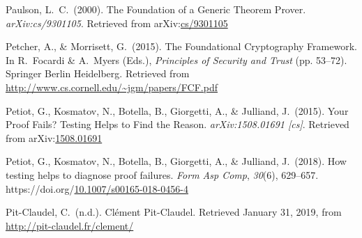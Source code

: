 \documentclass[12pt,twoside]{article}
\begin{document}
{\begin{thebibliography}{222}
\mdbibitemlabel{[Paulson, 2000]}Paulson, L.~C.~(2000). The Foundation of a Generic Theorem Prover. \emph{arXiv:cs/9301105}. Retrieved from arXiv:\href{http://arxiv.org/abs/cs/9301105}{cs/9301105}\label{paulson_foundation_2000}%

Petcher, A., \& Morrisett, G.~(2015). The Foundational Cryptography Framework. In R.~Focardi \& A.~Myers (Eds.), \emph{Principles of Security and Trust} (pp. 53–72). Springer Berlin Heidelberg. Retrieved from \href{http://www.cs.cornell.edu/~jgm/papers/FCF.pdf}{{\ttfamily http://\hspace{0pt}www.\hspace{0pt}cs.\hspace{0pt}cornell.\hspace{0pt}edu/\hspace{0pt}\textasciitilde{}jgm/\hspace{0pt}papers/\hspace{0pt}FCF.\hspace{0pt}pdf}}\label{petcher_foundational_2015}%

Petiot, G., Kosmatov, N., Botella, B., Giorgetti, A., \& Julliand, J.~(2015). Your Proof Fails? Testing Helps to Find the Reason. \emph{arXiv:1508.01691 {}[cs]}. Retrieved from arXiv:\href{http://arxiv.org/abs/1508.01691}{1508.01691}\label{petiot_your_2015}%

Petiot, G., Kosmatov, N., Botella, B., Giorgetti, A., \& Julliand, J.~(2018). How testing helps to diagnose proof failures. \emph{Form Asp Comp}, \emph{30}(6), 629–657. https://doi.org/\href{https://dx.doi.org/10.1007/s00165-018-0456-4}{10.1007/s00165-018-0456-4}\label{petiot_how_2018}%

Pit-Claudel, C.~(n.d.). Clément Pit-Claudel. Retrieved January 31, 2019, from \href{http://pit-claudel.fr/clement/}{{\ttfamily http://\hspace{0pt}pit-\hspace{0pt}claudel.\hspace{0pt}fr/\hspace{0pt}clement/\hspace{0pt}}}\label{pit-claudel_clement_nodate}%


\end{thebibliography}}
\end{document}

